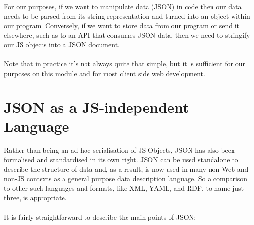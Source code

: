 \paragraph{} For our purposes, if we want to manipulate data (JSON) in code then our data needs to be parsed from its string representation and turned into an object within our program. Conversely, if we want to store data from our program or send it elsewhere, such as to an API that consumes JSON data, then we need to stringify our JS objects into a JSON document.

\paragraph{} Note that in practice it's not always quite that simple, but it is sufficient for our purposes on this module and for most client side web development.



\section{JSON as a JS-independent Language}
\paragraph{} Rather than being an ad-hoc serialisation of JS Objects, JSON has also been formalised and standardised in its own right. JSON can be used standalone to describe the structure of data and, as a result, is now used in many non-Web and non-JS contexts as a general purpose data description language. So a comparison to other such languages and formats, like XML, YAML, and RDF, to name just three, is appropriate.
\paragraph{} It is fairly straightforward to describe the main points of JSON:

